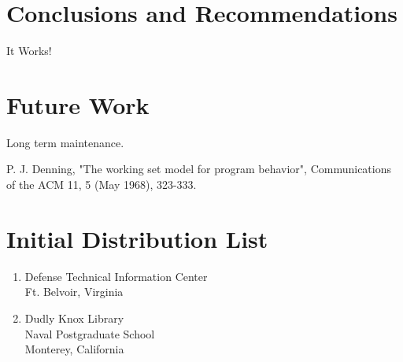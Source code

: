 \documentclass[twoside,thesis,twoadvisors]{npsreport}
\begin{document}
\chapter{Conclusions and Recommendations}
It Works!

\chapter{Future Work}
Long term maintenance.




\begin{thebibliography}{1}  %

P. J. Denning, "The working set model for program behavior", Communications of the ACM 11, 5 (May 1968), 323-333.
  
\end{thebibliography}

\NPSend


\chapter*{Initial Distribution List}
\singlespace
\begin{enumerate}
\item Defense Technical Information Center\\Ft. Belvoir, Virginia
\item Dudly Knox Library\\Naval Postgraduate School\\Monterey, California
\end{enumerate}
\end{document}
